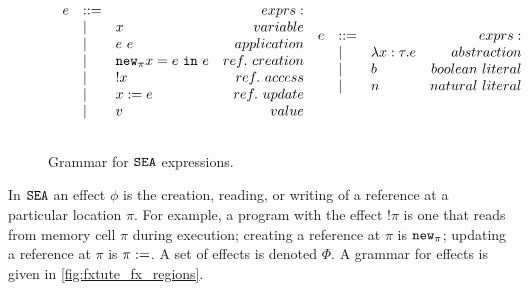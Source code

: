 \begin{figure}[h]

\[
\begin{array}{c}

\begin{array}{lllr}

e & ::= & ~ & exprs: \\
	& | & x & variable \\
	& | & e~e & application \\
	& | & \mathtt{new}_{\pi} x = e~\mathtt{in}~ e & ref.~creation\\
	& | & !x & ref.~access \\
	& | & x := e & ref.~update \\
	& | & v & value \\
	&&\\
	
\end{array}
	
\begin{array}{lllr}


e & ::= & ~ & exprs: \\
	& | & \lambda x: \tau. e & abstraction \\
	& | & b & boolean~literal \\
	& | & n & natural~literal \\
	&&\\
	

\end{array}
	
\end{array}
\]

\vspace{-12pt}
\caption{Grammar for $\mathtt{SEA}$ expressions.}
\label{fig:fx_tute}
\end{figure}

In $\mathtt{SEA}$ an effect $\phi$ is the creation, reading, or writing of a reference at a particular location $\pi$. For example, a program with the effect $!\pi$ is one that reads from memory cell $\pi$ during execution; creating a reference at $\pi$ is $\mathtt{new}_{\pi}$; updating a reference at $\pi$ is $\mathtt{\pi :=}$. A set of effects is denoted $\Phi$. A grammar for effects is given in \ref{fig:fxtute_fx_regions}.

